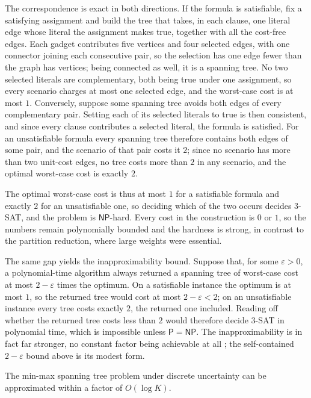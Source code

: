 The correspondence is exact in both directions.
If the formula is satisfiable, fix a satisfying assignment and build the tree that takes, in each clause, one literal edge whose literal the assignment makes true, together with all the cost-free edges.
Each gadget contributes five vertices and four selected edges, with one connector joining each consecutive pair, so the selection has one edge fewer than the graph has vertices; being connected as well, it is a spanning tree.
No two selected literals are complementary, both being true under one assignment, so every scenario charges at most one selected edge, and the worst-case cost is at most $1$.
Conversely, suppose some spanning tree avoids both edges of every complementary pair.
Setting each of its selected literals to true is then consistent, and since every clause contributes a selected literal, the formula is satisfied.
For an unsatisfiable formula every spanning tree therefore contains both edges of some pair, and the scenario of that pair costs it $2$; since no scenario has more than two unit-cost edges, no tree costs more than $2$ in any scenario, and the optimal worst-case cost is exactly $2$.

The optimal worst-case cost is thus at most $1$ for a satisfiable formula and exactly $2$ for an unsatisfiable one, so deciding which of the two occurs decides 3-SAT, and the problem is $\mathsf{NP}$-hard.
Every cost in the construction is $0$ or $1$, so the numbers remain polynomially bounded and the hardness is strong, in contrast to the partition reduction, where large weights were essential.

The same gap yields the inapproximability bound.
Suppose that, for some $\varepsilon > 0$, a polynomial-time algorithm always returned a spanning tree of worst-case cost at most $2 - \varepsilon$ times the optimum.
On a satisfiable instance the optimum is at most $1$, so the returned tree would cost at most $2 - \varepsilon < 2$; on an unsatisfiable instance every tree costs exactly $2$, the returned one included.
Reading off whether the returned tree costs less than $2$ would therefore decide 3-SAT in polynomial time, which is impossible unless $\mathsf{P} = \mathsf{NP}$.
The inapproximability is in fact far stronger, no constant factor being achievable at all \cite{KasperskiZielinski2011}; the self-contained $2 - \varepsilon$ bound above is its modest form.

\begin{theorem}\label{thm:mm-kunbdd-approx}
The min-max spanning tree problem under discrete uncertainty can be approximated within a factor of $O(\log K)$.
\end{theorem}

